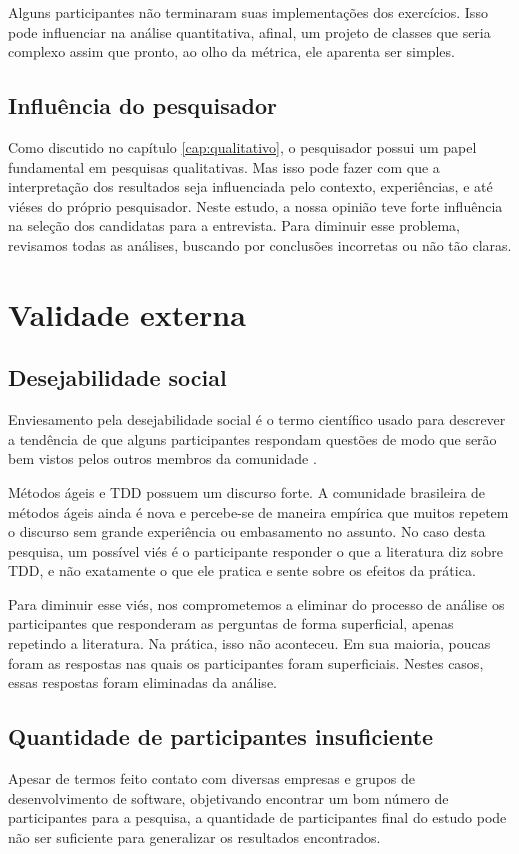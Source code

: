 Alguns participantes não terminaram suas implementações dos exercícios. Isso
pode influenciar na análise quantitativa, afinal, um projeto de classes que
seria complexo assim que pronto, ao olho da métrica, ele aparenta ser simples.

\subsection{Influência do pesquisador}

Como discutido no capítulo \ref{cap:qualitativo}, o pesquisador possui
um papel fundamental em pesquisas qualitativas. Mas isso pode fazer com que
a interpretação dos resultados seja influenciada pelo contexto, experiências,
e até viéses do próprio pesquisador.
Neste estudo, a nossa opinião teve forte influência na seleção dos candidatas
para a entrevista.
Para diminuir esse problema, revisamos todas as análises,
buscando por conclusões incorretas ou não tão claras. 

\section{Validade externa}

\subsection{Desejabilidade social}

Enviesamento pela desejabilidade social é o termo científico usado para descrever
a tendência de que alguns participantes respondam questões de modo que serão
bem vistos pelos outros membros da comunidade \cite{crowne}.

Métodos ágeis e TDD possuem um discurso forte. A comunidade brasileira de métodos
ágeis ainda é nova e percebe-se de maneira empírica que muitos repetem o discurso
sem grande experiência ou embasamento no assunto.
No caso desta pesquisa, um possível viés é o participante responder o que
a literatura diz sobre TDD, e não exatamente o que ele pratica e sente sobre
os efeitos da prática. 

Para diminuir esse viés, nos comprometemos a eliminar do processo de análise os participantes
que responderam as perguntas de forma superficial, apenas repetindo a literatura. Na prática,
isso não aconteceu. Em sua maioria, poucas foram as respostas nas quais os participantes
foram superficiais. Nestes casos, essas respostas foram eliminadas da análise.

\subsection{Quantidade de participantes insuficiente}

Apesar de termos feito contato
com diversas empresas e grupos de desenvolvimento de software,
objetivando encontrar um bom número de participantes para a pesquisa,
a quantidade de participantes final do estudo pode não ser suficiente para generalizar
os resultados encontrados. 

